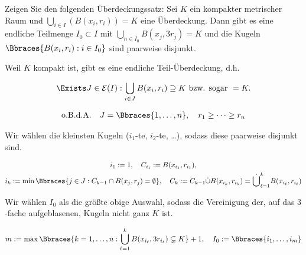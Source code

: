 
\begin{exercise}

Zeigen Sie den folgenden Überdeckungssatz:
Sei $K$ ein kompakter metrischer Raum und $\bigcup_{i \in I} (B(x_i, r_i)) = K$ eine Überdeckung.
Dann gibt es eine endliche Teilmenge $I_0 \subset I$ mit $\bigcup_{n \in I_0} B(x_j, 3 r_j) = K$ und die Kugeln $\Bbraces{B(x_i, r_i): i \in I_0}$ sind paarweise disjunkt.

\end{exercise}


\begin{solution}

Weil $K$ kompakt ist, gibt es eine endliche Teil-Überdeckung, d.h.

\begin{align*}
    \Exists J \in \mathcal{E}(I):
    \bigcup_{i \in J}
        B(x_i, r_i)
    \supseteq
    K
    ~\text{bzw. sogar}~
    =
    K.
\end{align*}

\begin{align*}
    \text{o.B.d.A.}
    \quad
    J = \Bbraces{1, \dots, n},
    \quad
    r_1 \geq \cdots \geq r_n
\end{align*}

Wir wählen die kleinsten Kugeln ($i_1$-te, $i_2$-te, \dots), sodass diese paarweise disjunkt sind.

\begin{gather*}
    i_1 := 1,
    \quad
    C_{i_1} := B(x_{i_1}, r_{i_1}), \\
    i_k
    :=
    \min
    \Bbraces
    {
        j \in J:
        C_{k-1} \cap B(x_j, r_j) = \emptyset
    },
    \quad
    C_k
    :=
    C_{k-1} \dot \cup B(x_{i_k}, r_{i_k})
    =
    \dot \bigcup_{\ell = 1}^k
        B(x_{i_\ell}, r_{i_\ell})
\end{gather*}

Wir wählen $I_0$ als die größte obige Auswahl, sodass die Vereinigung der, auf das $3$-fache aufgeblasenen, Kugeln nicht ganz $K$ ist.

\begin{align*}
    m
    :=
    \max
    \Bbraces
    {
        k = 1, \dots, n:
        \bigcup_{\ell = 1}^k
            B(x_{i_\ell}, 3 r_{i_\ell})
        \subsetneq
        K
    }
    +
    1,
    \quad
    I_0 := \Bbraces{i_1, \dots, i_m}
\end{align*}

\end{solution}

